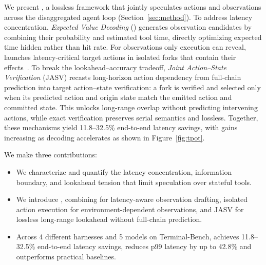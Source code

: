 We present \sysname{}, a lossless framework that jointly speculates actions and observations across the disaggregated agent loop
(Section~\ref{sec:method}). 
To address latency concentration, \emph{Expected
Value Decoding} (\evd) generates observation candidates by combining their probability and estimated tool time, directly optimizing expected time hidden rather than hit rate. 
For observations only execution can reveal, \sysname{} launches latency-critical target actions in isolated forks that contain their effects~\citep{cubesandbox_2026,deltabox2026}. 
To break the lookahead--accuracy tradeoff, \emph{Joint Action--State Verification} (JASV) recasts long-horizon action dependency from full-chain prediction into target action--state verification: a fork is verified and selected only when its predicted action
and origin state match the emitted action and committed state. This unlocks
long-range overlap without predicting intervening actions, while exact
verification preserves serial semantics and lossless. Together, these mechanisms yield
11.8--32.5\% end-to-end latency savings, with gains increasing as decoding
accelerates as shown in Figure~\ref{fig:tpot}.

We make three contributions:
\begin{itemize}
\item We characterize and quantify the latency concentration, information
boundary, and lookahead tension that limit speculation over stateful tools.
\item We introduce \sysname{}, combining \evd{} for latency-aware observation
drafting, isolated action execution for environment-dependent observations, and
JASV for lossless long-range lookahead without full-chain prediction.
\item Across 4 different harnesses and 5 models on Terminal-Bench, \sysname{} achieves 11.8--32.5\% end-to-end latency savings, reduces p99 latency by up to 42.8\% and outperforms practical baselines.
\end{itemize}
